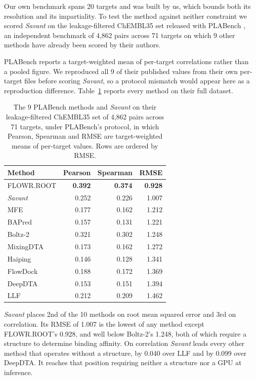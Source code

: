 \documentclass[times, twoside]{zHenriquesLab-StyleBioRxiv}
\newcommand{\savant}{\textit{Savant}\xspace}
\begin{document}
Our own benchmark spans 20 targets and was built by us, which bounds both its resolution and its impartiality. To test the method against neither constraint we scored \savant on the leakage-filtered ChEMBL35 set released with PLABench \cite{plabench_data,plabench_code}, an independent benchmark of 4,862 pairs across 71 targets on which 9 other methods have already been scored by their authors.

PLABench reports a target-weighted mean of per-target correlations rather than a pooled figure. We reproduced all 9 of their published values from their own per-target files before scoring \savant, so a protocol mismatch would appear here as a reproduction difference. Table~\ref{tab:plabench} reports every method on their full dataset.

\begin{table}[h]
\centering
\caption{The 9 PLABench methods and \savant on their leakage-filtered ChEMBL35 set of 4,862 pairs across 71 targets, under PLABench's protocol, in which Pearson, Spearman and RMSE are target-weighted means of per-target values. Rows are ordered by RMSE.}
\label{tab:plabench}
\small
\begin{tabular}{lrrr}
\toprule
Method & Pearson & Spearman & RMSE \\
\midrule
FLOWR.ROOT      & \textbf{0.392} & \textbf{0.374} & \textbf{0.928} \\
\savant         & 0.252 & 0.226 & 1.007 \\
MFE             & 0.177 & 0.162 & 1.212 \\
BAPred          & 0.157 & 0.131 & 1.221 \\
Boltz-2         & 0.321 & 0.302 & 1.248 \\
MixingDTA       & 0.173 & 0.162 & 1.272 \\
Haiping         & 0.146 & 0.128 & 1.341 \\
FlowDock        & 0.188 & 0.172 & 1.369 \\
DeepDTA         & 0.153 & 0.151 & 1.394 \\
LLF             & 0.212 & 0.209 & 1.462 \\
\bottomrule
\end{tabular}
\end{table}

\savant places 2nd of the 10 methods on root mean squared error and 3rd on correlation. Its RMSE of 1.007 is the lowest of any method except FLOWR.ROOT's 0.928, and well below Boltz-2's 1.248, both of which require a structure to determine binding affinity. On correlation \savant leads every other method that operates without a structure, by 0.040 over LLF and by 0.099 over DeepDTA. It reaches that position requiring neither a structure nor a GPU at inference.
\end{document}
